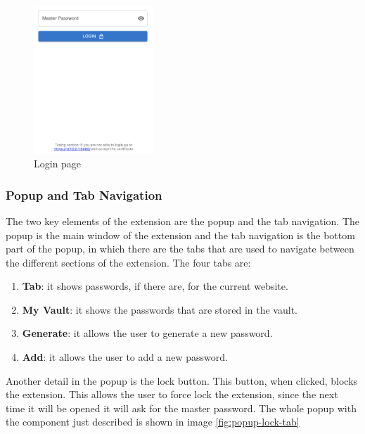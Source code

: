 \begin{figure}[h!]
    \centering
    \vspace{0.5cm}
    \includegraphics[width=0.4\textwidth]{images/extension/login.png}
    \caption{Login page}
    \label{fig:login} %
\end{figure}


\subsubsection {Popup and Tab Navigation}

The two key elements of the extension are the popup and the tab navigation. The popup is the main window of the extension and the tab navigation is the bottom part of the popup, in which there are the tabs that are used to navigate between the different sections of the extension. The four tabs are:

\begin{enumerate}
    \item \textbf{Tab}: it shows passwords, if there are, for the current website.
    \item \textbf{My Vault}: it shows the passwords that are stored in the vault.
    \item \textbf{Generate}: it allows the user to generate a new password.
    \item \textbf{Add}: it allows the user to add a new password.
\end{enumerate}


Another detail in the popup is the lock button. This button, when clicked, blocks the extension. This allows the user to force lock the extension, since the next time it will be opened it will ask for the master password.
The whole popup with the component just described is shown in image \ref*{fig:popup-lock-tab}

